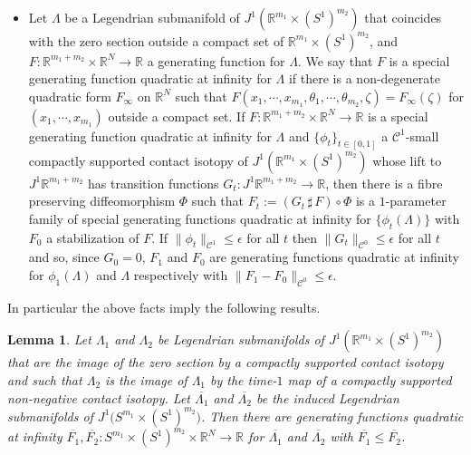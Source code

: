 \documentclass{amsart}
\newtheorem{lemma}[thm]{Lemma}
\theoremstyle{remark}
\begin{document}
\begin{itemize}
\item Let $\Lambda$ be a Legendrian submanifold
of $J^1 (\mathbb{R}^{m_1} \times (S^1)^{m_2})$
that coincides with the zero section
outside a compact set of $\mathbb{R}^{m_1} \times (S^1)^{m_2}$,
and $F: \mathbb{R}^{m_1 + m_2} \times \mathbb{R}^N \rightarrow \mathbb{R}$
a generating function for $\Lambda$.
We say that $F$ is a special generating function quadratic at infinity for $\Lambda$
if there is a non-degenerate quadratic form $F_{\infty}$ on $\mathbb{R}^N$
such that $F (x_1, \cdots, x_{m_1}, \theta_1, \cdots, \theta_{m_2}, \zeta) = F_{\infty} (\zeta)$
for $(x_1, \cdots, x_{m_1})$ outside a compact set.
If $F: \mathbb{R}^{m_1 + m_2} \times \mathbb{R}^N \rightarrow \mathbb{R}$
is a special generating function quadratic at infinity for $\Lambda$
and $\{\phi_t\}_{t \in [0, 1]}$ a $\mathcal{C}^1$-small
compactly supported contact isotopy of $J^1 (\mathbb{R}^{m_1} \times (S^1)^{m_2})$
whose lift to $J^1 \mathbb{R}^{m_1 + m_2}$
has transition functions $G_t: J^1 \mathbb{R}^{m_1 + m_2} \rightarrow \mathbb{R}$,
then there is a fibre preserving diffeomorphism $\Phi$
such that $F_t := (G_t \,\sharp\, F) \circ \Phi$
is a $1$-parameter family of special generating functions quadratic at infinity
for $\{\phi_t(\Lambda)\}$
with $F_0$ a stabilization of $F$.
If $\lVert \phi_t \rVert_{\mathcal{C}^1} \leq \epsilon$ for all $t$
then $\lVert G_t \rVert_{\mathcal{C}^0} \leq \epsilon$ for all $t$
and so, since $G_0 = 0$,
$F_1$ and $F_0$ are generating functions quadratic at infinity
for $\phi_1 (\Lambda)$ and $\Lambda$ respectively
with $\lVert F_1 - F_0 \rVert_{\mathcal{C}^0} \leq \epsilon$.

\end{itemize}

In particular the above facts
imply the following results.

\begin{lemma}\label{lemma: with transition functions}
Let $\Lambda_1$ and $\Lambda_2$ be Legendrian submanifolds
of $J^1 (\mathbb{R}^{m_1} \times (S^1)^{m_2})$
that are the image of the zero section
by a compactly supported contact isotopy
and such that $\Lambda_2$ is the image of $\Lambda_1$
by the time-$1$ map of a compactly supported
non-negative contact isotopy.
Let $\overline{\Lambda_1}$ and $\overline{\Lambda_2}$
be the induced Legendrian submanifolds
of $J^1 \big(S^{m_1} \times (S^1)^{m_2}\big)$.
Then there are generating functions quadratic at infinity
$\overline{F_1}, \overline{F_2}:
S^{m_1} \times (S^1)^{m_2} \times \mathbb{R}^N \rightarrow \mathbb{R}$
for $\overline{\Lambda_1}$ and $\overline{\Lambda_2}$
with $\overline{F_1} \leq \overline{F_2}$.
\end{lemma}
\end{document}

